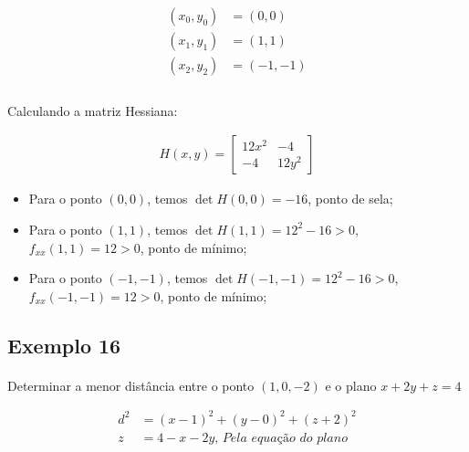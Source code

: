 \documentclass{article}
\begin{document}
            \begin{align*}
                (x_0, y_0) &= (0, 0)\\
                (x_1, y_1) &= (1, 1)\\
                (x_2, y_2) &= (-1, -1)\\
            \end{align*}

            \paragraph{}
            Calculando a matriz Hessiana:

            \begin{align*}
                H(x, y) =
                \left[
                    \begin{matrix}
                        12x^2 & -4\\
                        -4 & 12y^2
                    \end{matrix}
                \right]
            \end{align*}

            \begin{itemize}
                \item Para o ponto $(0,0)$, temos $\det H(0, 0) = -16$, ponto de sela;
                \item Para o ponto $(1,1)$, temos $\det H(1, 1) = 12^2 - 16 > 0$, $f_{xx}(1, 1) = 12 > 0$, ponto de mínimo;
                \item Para o ponto $(-1,-1)$, temos $\det H(-1, -1) = 12^2 - 16 > 0$, $f_{xx}(-1, -1) = 12 > 0$, ponto de mínimo;
            \end{itemize}
        
        \subsection{Exemplo 16}
            \paragraph{}
            Determinar a menor distância entre o ponto $(1, 0, -2)$ e o plano $x + 2y + z = 4$

            \begin{align*}
                d^2 &= (x - 1)^2 + (y - 0)^2 + (z + 2)^2\\
                z &= 4 - x - 2y \textit{, Pela equação do plano}\\
            \end{align*}
\end{document}
